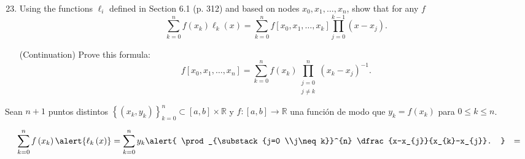 \begin{frame}
	\begin{enumerate}\setcounter{enumi}{22}
		\item

		      Using the functions $\ell_{i}$ defined in Section 6.1
		      (p. 312) and based on nodes $x_{0}, x_{1}, \ldots, x_{n}$,
		      show that for any $f$
		      \begin{equation*}
			      \sum_{k=0}^{n}
			      f\left(x_{k}\right)
			      \ell_{k}\left(x\right)=
			      \sum_{k=0}^{n}
			      f\left[x_{0},x_{1},\ldots,x_{k}\right]
			      \prod_{j=0}^{k-1}
			      \left(x-x_{j}\right).
		      \end{equation*}

		      (Continuation) Prove this formula:
		      \begin{equation*}
			      f\left[x_{0},x_{1},\ldots,x_{n}\right]=
			      \sum_{k=0}^{n}
			      f\left(x_{k}\right)
			      \prod_{\substack{j=0\\j\neq k}}^{n}
			      {\left(x_{k}-x_{j}\right)}^{-1}.
		      \end{equation*}
	\end{enumerate}
\end{frame}

\begin{frame}
	\begin{solution}
		Sean $n+1$ puntos distintos
		\begin{math}
			{
				\left\{
				\left(x_{k},y_{k}\right)
				\right\}
			}_{k=0}^{n}\subset
			\left[a,b\right]\times\mathbb{R}
		\end{math}
		y
		\begin{math}
			f\colon\left[a,b\right]\to
			\mathbb{R}
		\end{math}
		una función de modo que
		\begin{math}
			y_{k}=
			f\left(x_{k}\right)
		\end{math}
		para $0\leq k\leq n$.

		\begin{align*}
			\sum_{k=0}^{n}
			f\left(x_{k}\right)
			\alert{\ell_{k}\left(x\right)} & =
			\sum_{k=0}^{n}
			y_{k}
			\alert{
			\prod_{\substack{j=0               \\j\neq k}}^{n}
			\dfrac{x-x_{j}}{x_{k}-x_{j}}.
			}                              & =
			\\
		\end{align*}
	\end{solution}
\end{frame}